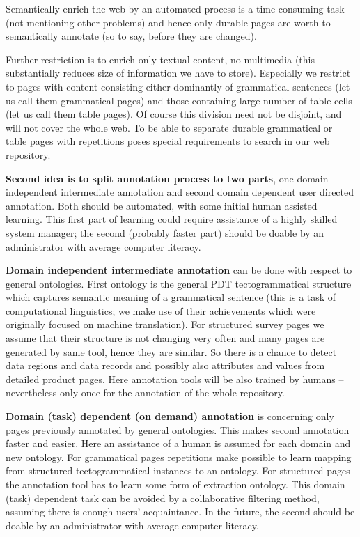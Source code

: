 \documentclass{sig-alternate}
\begin{document}
Semantically enrich the web by an automated process is a time consuming task (not mentioning other problems) and hence only durable pages are worth to semantically annotate (so to say, before they are changed). 

Further restriction is to enrich only textual content, no multimedia (this substantially reduces size of information we have to store). Especially we restrict to pages with content consisting either dominantly of grammatical sentences (let us call them grammatical pages) and those containing large number of table cells (let us call them table pages). Of course this division need not be disjoint, and will not cover the whole web. 
To be able to separate durable grammatical or table pages with repetitions poses special requirements to search in our web repository.

\textbf{Second idea is to split annotation process to two parts}, one domain independent intermediate annotation and second domain dependent user directed annotation. Both should be automated, with some initial human assisted learning. This first part of learning could require assistance of a highly skilled system manager; the second (probably faster part) should be doable by an administrator with average computer literacy. 

\textbf{Domain independent intermediate annotation} can be done with respect to general ontologies. First ontology is the general PDT tectogrammatical structure which captures semantic meaning of a grammatical sentence (this is a task of computational linguistics; we make use of their achievements which were originally focused on machine translation). For structured survey pages we assume that their structure is not changing very often and many pages are generated by same tool, hence they are similar. So there is a chance to detect data regions and data records and possibly also attributes and values from detailed product pages. Here annotation tools will be also trained by humans -- nevertheless only once for the annotation of the whole repository. 

\textbf{Domain (task) dependent (on demand) annotation} is concerning only pages previously annotated by general ontologies. This makes second annotation faster and easier. Here an assistance of a human is assumed for each domain and new ontology. For grammatical pages repetitions make possible to learn mapping from structured tectogrammatical instances to an ontology. For structured pages the annotation tool has to learn some form of extraction ontology. This domain (task) dependent task can be avoided by a collaborative filtering method, assuming there is enough users' acquaintance. In the future, the second should be doable by an administrator with average computer literacy. 
\end{document}
